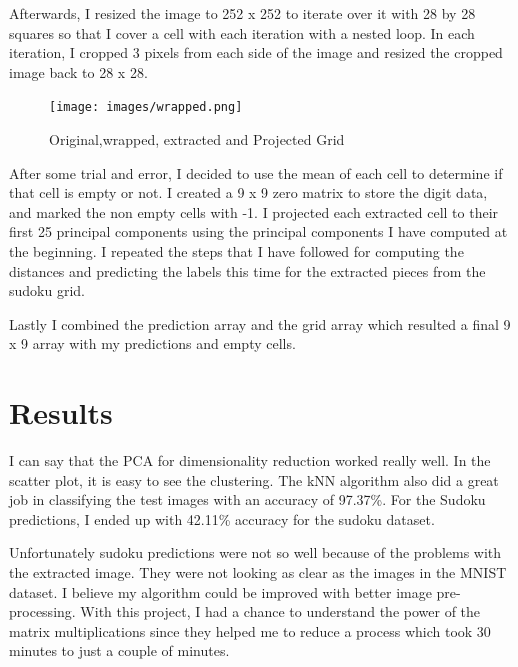 Afterwards, I resized the image to 252 x 252 to iterate over it with 28 by 28
squares so that I cover a cell with each iteration with a nested loop. In each
iteration, I cropped 3 pixels from each side of the image and resized the
cropped image back to 28 x 28.

\begin{figure}[H]
    \centering
    \texttt{[image: images/wrapped.png]}
    \caption*{Original,wrapped, extracted and Projected Grid}
    \setlength{\belowcaptionskip}{-20pt}
    \setlength{\abovecaptionskip}{-20pt}
\end{figure}

After some trial and error, I decided to use the mean of each cell to determine
if that cell is empty or not. I created a 9 x 9 zero matrix to store the digit
data, and marked the non empty cells with -1. I projected each extracted cell to
their first 25 principal components using the principal components I have
computed at the beginning. I repeated the steps that I have followed for
computing the distances and predicting the labels this time for the extracted
pieces from the sudoku grid.

Lastly I combined the prediction array and the grid array which resulted a final
9 x 9 array with my predictions and empty cells.


\section*{Results}

I can say that the PCA for dimensionality reduction worked really well. In the
scatter plot, it is easy to see the clustering. The kNN algorithm also did a
great job in classifying the test images with an accuracy of 97.37\%. For the
Sudoku predictions, I ended up with 42.11\% accuracy for the sudoku dataset.

Unfortunately sudoku predictions were not so well because of the problems with
the extracted image.  They were not looking as clear as the images in the MNIST
dataset. I believe my algorithm could be improved with better image
pre-processing. With this project, I had a chance to understand the power of the
matrix multiplications since they helped me to reduce a process which took 30
minutes to just a couple of minutes.

